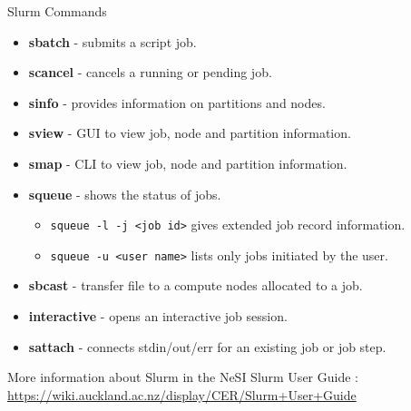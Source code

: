 \documentclass[final,t]{beamer}
\begin{document}
 \begin{frame}[fragile]{} 
  \begin{columns}[t]
    \begin{column}{.35\linewidth}


      \begin{block}{Slurm Commands}
        \begin{itemize}
        \item  \textbf{sbatch} - submits a script job.
        \item \textbf{scancel} - cancels a running or pending job.
	    \item \textbf{sinfo} - provides information on partitions and nodes.
	    \item \textbf{sview} - GUI to view job, node and partition information.
	    \item \textbf{smap} - CLI to view job, node and partition information.
        \item  \textbf{squeue} - shows the status of jobs. 
         \begin{itemize}
              \item \verb|squeue -l -j <job id>| gives extended job record information.
              \item \verb|squeue -u <user name>| lists only jobs initiated by the user.
        \end{itemize}
        \item \textbf{sbcast} - transfer file to a compute nodes allocated to a job.
        \item \textbf{interactive} - opens an interactive job session.
	    \item \textbf{sattach} - connects stdin/out/err for an existing job or job step.
        \end{itemize}
       More information about Slurm in the NeSI Slurm User Guide : \url{https://wiki.auckland.ac.nz/display/CER/Slurm+User+Guide}
      \end{block}


\end{column}
\end{columns}
\end{frame}
\end{document}
